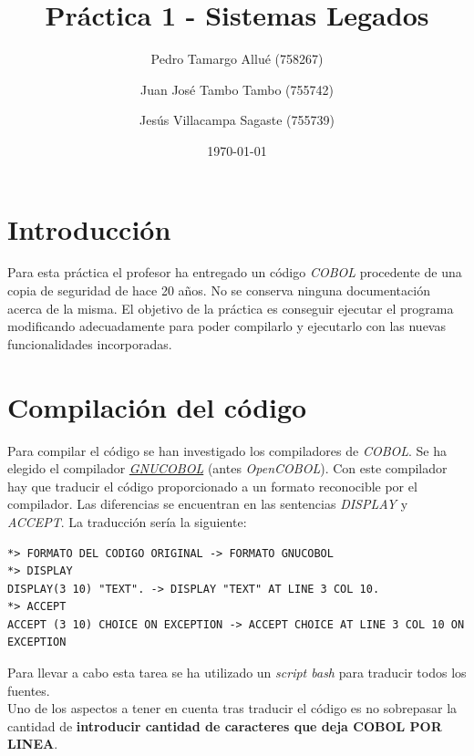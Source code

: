 \documentclass[10pt,a4paper]{article}
\begin{document}
\begin{titlepage}
\title{\textbf{{\Huge Práctica 1 - Sistemas Legados}}}
\author{
	Pedro Tamargo Allué (758267)
	\and
	Juan José Tambo Tambo (755742)
	\and
	Jesús Villacampa Sagaste (755739)
}
\date{\today}
\clearpage\maketitle
\thispagestyle{empty}
\tableofcontents
\listoffigures
\end{titlepage}

\section{Introducción}

Para esta práctica el profesor ha entregado un código \emph{COBOL} procedente de una copia de seguridad de hace 20 años. No se conserva ninguna documentación acerca de la misma. El objetivo de la práctica es conseguir ejecutar el programa modificando adecuadamente para poder compilarlo y ejecutarlo con las nuevas funcionalidades incorporadas.

\section{Compilación del código}

Para compilar el código se han investigado los compiladores de \emph{COBOL}. Se ha elegido el compilador \href{https://sourceforge.net/projects/gnucobol/}{\emph{GNUCOBOL}} (antes \emph{OpenCOBOL}). Con este compilador hay que traducir el código proporcionado a un formato reconocible por el compilador. Las diferencias se encuentran en las sentencias \emph{DISPLAY} y \emph{ACCEPT}. La traducción sería la siguiente:

\begin{lstlisting}
*> FORMATO DEL CODIGO ORIGINAL -> FORMATO GNUCOBOL
*> DISPLAY
DISPLAY(3 10) "TEXT". -> DISPLAY "TEXT" AT LINE 3 COL 10.
*> ACCEPT 
ACCEPT (3 10) CHOICE ON EXCEPTION -> ACCEPT CHOICE AT LINE 3 COL 10 ON EXCEPTION
\end{lstlisting}

Para llevar a cabo esta tarea se ha utilizado un \emph{script bash} para traducir todos los fuentes.\\

Uno de los aspectos a tener en cuenta tras traducir el código es no sobrepasar la cantidad de {\Huge \textbf{introducir cantidad de caracteres que deja COBOL POR LINEA}}.\\
\end{document}
